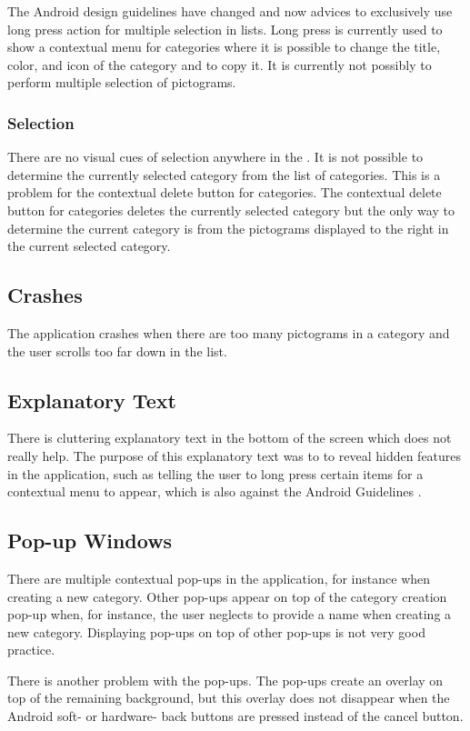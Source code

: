 The Android design guidelines have changed and now advices to exclusively use long press action for multiple selection in lists. Long press is currently used to show a contextual menu for categories where it is possible to change the title, color, and icon of the category and to copy it. It is currently not possibly to perform multiple selection of pictograms. 

\subsubsection{Selection}

There are no visual cues of selection anywhere in the \ct. It is not possible to determine the currently selected category from the list of categories. This is a problem for the contextual delete button for categories. The contextual delete button for categories deletes the currently selected category but the only way to determine the current category is from the pictograms displayed to the right in the current selected category. 

\subsection{Crashes}

The application crashes when there are too many pictograms in a category and the user scrolls too far down in the list. 

\subsection{Explanatory Text}

There is cluttering explanatory text in the bottom of the screen which does not really help. The purpose of this explanatory text was to to reveal hidden features in the application, such as telling the user to long press certain items for a contextual menu to appear, which is also against the Android Guidelines \parencite{android_guidelines_longpress}.

\subsection{Pop-up Windows}

There are multiple contextual pop-ups in the application, for instance when creating a new category. Other pop-ups appear on top of the category creation pop-up when, for instance, the user neglects to provide a name when creating a new category. Displaying pop-ups on top of other pop-ups is not very good practice.

There is another problem with the pop-ups. The pop-ups create an overlay on top of the remaining background, but this overlay does not disappear when the Android soft- or hardware- back buttons are pressed instead of the cancel button. 
